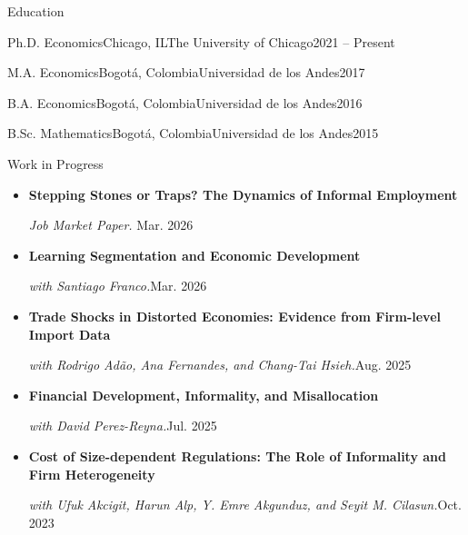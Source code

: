 \documentclass[]{kyvernitis-resume}
\begin{document}
\resumeheader
{}
{}

\begin{section}{Education}
    \begin{subsectionnobullet}{Ph.D. Economics}{Chicago, IL}{The University of Chicago}{2021 -- Present}
    \end{subsectionnobullet}
    \begin{subsectionnobullet}{M.A. Economics}{Bogotá, Colombia}{Universidad de los Andes}{2017}
    \end{subsectionnobullet}
    \begin{subsectionnobullet}{B.A. Economics}{Bogotá, Colombia}{Universidad de los Andes}{2016}
    \end{subsectionnobullet}
    \begin{subsectionnobullet}{B.Sc. Mathematics}{Bogotá, Colombia}{Universidad de los Andes}{2015}
    \end{subsectionnobullet}
\end{section}

\begin{section}{Work in Progress}
\begin{itemize}[leftmargin=0pt]
    \item \textbf{Stepping Stones or Traps? The Dynamics of Informal Employment} \newline
    \begin{small}
        \textit{Job Market Paper.} \hfill Mar. 2026
    \end{small}
    \item \textbf{Learning Segmentation and Economic Development} \newline
    \begin{small}\textit{with Santiago Franco.}\hfill Mar. 2026\end{small}
    \item \textbf{Trade Shocks in Distorted Economies: Evidence from Firm-level Import Data} \newline
     \begin{small}\textit{with Rodrigo Adão, Ana Fernandes, and Chang-Tai Hsieh.}\hfill Aug. 2025\end{small}
    \item \textbf{Financial Development, Informality, and Misallocation} \newline
    \begin{small}\textit{with David Perez-Reyna.}\hfill Jul. 2025\end{small}
    \item \textbf{Cost of Size-dependent Regulations: The Role of Informality and Firm Heterogeneity} \newline
    \begin{small}\textit{with Ufuk Akcigit, Harun Alp, Y. Emre Akgunduz, and Seyit M. Cilasun.}\hfill Oct. 2023\end{small}
\end{itemize}
\end{section}
\end{document}
